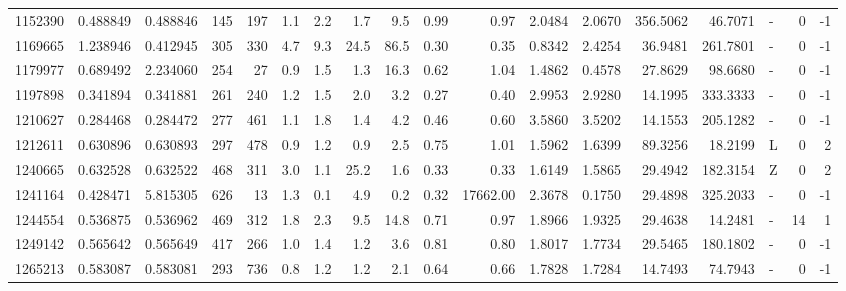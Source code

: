 \begin{tabular}{rrrrrrrrrrrrrrrlrr}
   1152390 & 0.488849 &   0.488846 &  145 &  197 &      1.1 &      2.2 &     1.7 &      9.5 &       0.99 &        0.97 &  2.0484 &  2.0670 &  356.5062 &   46.7071 &             - &        0 &         -1 \\
   1169665 & 1.238946 &   0.412945 &  305 &  330 &      4.7 &      9.3 &    24.5 &     86.5 &       0.30 &        0.35 &  0.8342 &  2.4254 &   36.9481 &  261.7801 &             - &        0 &         -1 \\
   1179977 & 0.689492 &   2.234060 &  254 &   27 &      0.9 &      1.5 &     1.3 &     16.3 &       0.62 &        1.04 &  1.4862 &  0.4578 &   27.8629 &   98.6680 &             - &        0 &         -1 \\
   1197898 & 0.341894 &   0.341881 &  261 &  240 &      1.2 &      1.5 &     2.0 &      3.2 &       0.27 &        0.40 &  2.9953 &  2.9280 &   14.1995 &  333.3333 &             - &        0 &         -1 \\
   1210627 & 0.284468 &   0.284472 &  277 &  461 &      1.1 &      1.8 &     1.4 &      4.2 &       0.46 &        0.60 &  3.5860 &  3.5202 &   14.1553 &  205.1282 &             - &        0 &         -1 \\
   1212611 & 0.630896 &   0.630893 &  297 &  478 &      0.9 &      1.2 &     0.9 &      2.5 &       0.75 &        1.01 &  1.5962 &  1.6399 &   89.3256 &   18.2199 &             L &        0 &          2 \\
   1240665 & 0.632528 &   0.632522 &  468 &  311 &      3.0 &      1.1 &    25.2 &      1.6 &       0.33 &        0.33 &  1.6149 &  1.5865 &   29.4942 &  182.3154 &             Z &        0 &          2 \\
   1241164 & 0.428471 &   5.815305 &  626 &   13 &      1.3 &      0.1 &     4.9 &      0.2 &       0.32 &    17662.00 &  2.3678 &  0.1750 &   29.4898 &  325.2033 &             - &        0 &         -1 \\
   1244554 & 0.536875 &   0.536962 &  469 &  312 &      1.8 &      2.3 &     9.5 &     14.8 &       0.71 &        0.97 &  1.8966 &  1.9325 &   29.4638 &   14.2481 &             - &       14 &          1 \\
   1249142 & 0.565642 &   0.565649 &  417 &  266 &      1.0 &      1.4 &     1.2 &      3.6 &       0.81 &        0.80 &  1.8017 &  1.7734 &   29.5465 &  180.1802 &             - &        0 &         -1 \\
   1265213 & 0.583087 &   0.583081 &  293 &  736 &      0.8 &      1.2 &     1.2 &      2.1 &       0.64 &        0.66 &  1.7828 &  1.7284 &   14.7493 &   74.7943 &             - &        0 &         -1 \\

\end{tabular}
